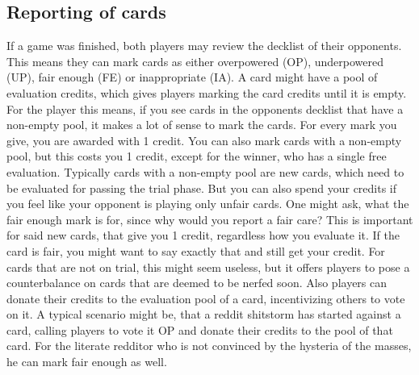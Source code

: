 \documentclass{article}
\begin{document}
\subsection{Reporting of cards}
%
If a game was finished, both players may review the decklist of their opponents. This means they can mark cards as either overpowered (OP), underpowered (UP), fair enough (FE) or inappropriate (IA). A card might have a pool of evaluation credits, which gives players marking the card credits until it is empty. For the player this means, if you see cards in the opponents decklist that have a non-empty pool, it makes a lot of sense to mark the cards. For every mark you give, you are awarded with 1 credit. You can also mark cards with a non-empty pool, but this costs you 1 credit, except for the winner, who has a single free evaluation. Typically cards with a non-empty pool are new cards, which need to be evaluated for passing the trial phase. But you can also spend your credits if you feel like your opponent is playing only unfair cards. One might ask, what the fair enough mark is for, since why would you report a fair care? This is important for said new cards, that give you 1 credit, regardless how you evaluate it. If the card is fair, you might want to say exactly that and still get your credit. For cards that are not on trial, this might seem useless, but it offers players to pose a counterbalance on cards that are deemed to be nerfed soon. Also players can donate their credits to the evaluation pool of a card, incentivizing others to vote on it. A typical scenario might be, that a reddit shitstorm has started against a card, calling players to vote it OP and donate their credits to the pool of that card. For the literate redditor who is not convinced by the hysteria of the masses, he can mark fair enough as well.
%
\end{document}
